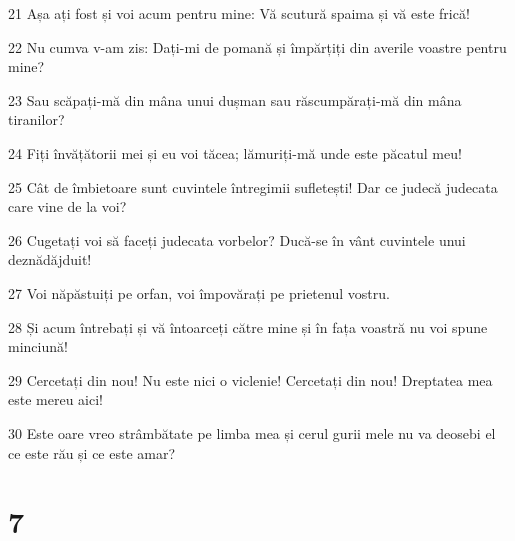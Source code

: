\par 21 Așa ați fost și voi acum pentru mine: Vă scutură spaima și vă este frică!
\par 22 Nu cumva v-am zis: Dați-mi de pomană și împărțiți din averile voastre pentru mine?
\par 23 Sau scăpați-mă din mâna unui dușman sau răscumpărați-mă din mâna tiranilor?
\par 24 Fiți învățătorii mei și eu voi tăcea; lămuriți-mă unde este păcatul meu!
\par 25 Cât de îmbietoare sunt cuvintele întregimii sufletești! Dar ce judecă judecata care vine de la voi?
\par 26 Cugetați voi să faceți judecata vorbelor? Ducă-se în vânt cuvintele unui deznădăjduit!
\par 27 Voi năpăstuiți pe orfan, voi împovărați pe prietenul vostru.
\par 28 Și acum întrebați și vă întoarceți către mine și în fața voastră nu voi spune minciună!
\par 29 Cercetați din nou! Nu este nici o viclenie! Cercetați din nou! Dreptatea mea este mereu aici!
\par 30 Este oare vreo strâmbătate pe limba mea și cerul gurii mele nu va deosebi el ce este rău și ce este amar?

\chapter{7}

